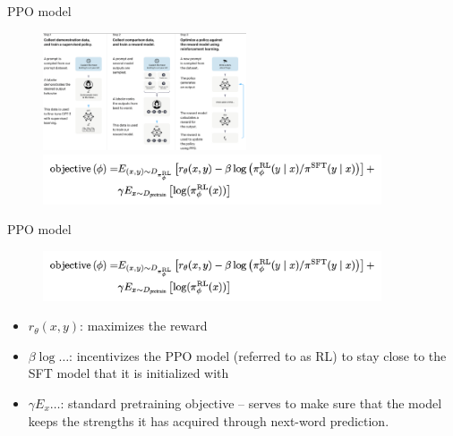 \begin{vbframe}{PPO model}


\begin{figure}
\centering
\includegraphics[width = 6cm]{figure/threesteps.png}

\includegraphics[width = 10cm]{figure/objectiveppo.png}
\end{figure}



\vfill

\end{vbframe}


\begin{vbframe}{PPO model}


\begin{figure}
\centering
\includegraphics[width = 10cm]{figure/objectiveppo.png}
\end{figure}


\begin{itemize}
\item $r_\theta(x,y)$: maximizes the reward
  \item $\beta \log \ldots$: incentivizes the PPO model
    (referred to as RL) to stay close to the SFT model that
    it is initialized with 
    \item $\gamma E_x \ldots$: standard
      pretraining objective -- serves to make sure
      that the model keeps the strengths it has acquired
      through next-word prediction.
\end{itemize}



\vfill

\end{vbframe}


